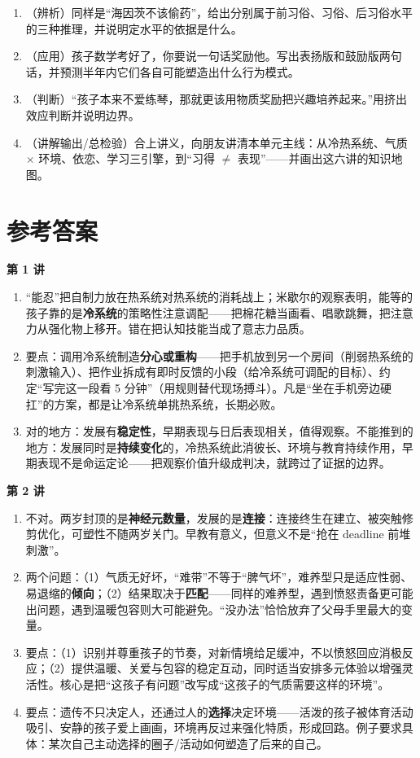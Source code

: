 \documentclass[UTF8,a4paper,11pt]{ctexart}
\begin{document}
\begin{exercise}[今日自测]
\begin{enumerate}
  \item （辨析）同样是“海因茨不该偷药”，给出分别属于前习俗、习俗、后习俗水平的三种推理，并说明定水平的依据是什么。
  \item （应用）孩子数学考好了，你要说一句话奖励他。写出表扬版和鼓励版两句话，并预测半年内它们各自可能塑造出什么行为模式。
  \item （判断）“孩子本来不爱练琴，那就更该用物质奖励把兴趣培养起来。”用挤出效应判断并说明边界。
  \item （讲解输出/总检验）合上讲义，向朋友讲清本单元主线：从冷热系统、气质 $\times$ 环境、依恋、学习三引擎，到“习得 $\neq$ 表现”——并画出这六讲的知识地图。
\end{enumerate}
\end{exercise}

\newpage

\section*{参考答案}

\textbf{第 1 讲}
\begin{enumerate}
  \item “能忍”把自制力放在热系统对热系统的消耗战上；米歇尔的观察表明，能等的孩子靠的是\textbf{冷系统}的策略性注意调配——把棉花糖当画看、唱歌跳舞，把注意力从强化物上移开。错在把认知技能当成了意志力品质。
  \item 要点：调用冷系统制造\textbf{分心或重构}——把手机放到另一个房间（削弱热系统的刺激输入）、把作业拆成有即时反馈的小段（给冷系统可调配的目标）、约定“写完这一段看 5 分钟”（用规则替代现场搏斗）。凡是“坐在手机旁边硬扛”的方案，都是让冷系统单挑热系统，长期必败。
  \item 对的地方：发展有\textbf{稳定性}，早期表现与日后表现相关，值得观察。不能推到的地方：发展同时是\textbf{持续变化}的，冷热系统此消彼长、环境与教育持续作用，早期表现不是命运定论——把观察价值升级成判决，就跨过了证据的边界。
\end{enumerate}

\textbf{第 2 讲}
\begin{enumerate}
  \item 不对。两岁封顶的是\textbf{神经元数量}，发展的是\textbf{连接}：连接终生在建立、被突触修剪优化，可塑性不随两岁关门。早教有意义，但意义不是“抢在 deadline 前堆刺激”。
  \item 两个问题：（1）气质无好坏，“难带”不等于“脾气坏”，难养型只是适应性弱、易退缩的\textbf{倾向}；（2）结果取决于\textbf{匹配}——同样的难养型，遇到愤怒责备更可能出问题，遇到温暖包容则大可能避免。“没办法”恰恰放弃了父母手里最大的变量。
  \item 要点：（1）识别并尊重孩子的节奏，对新情境给足缓冲，不以愤怒回应消极反应；（2）提供温暖、关爱与包容的稳定互动，同时适当安排多元体验以增强灵活性。核心是把“这孩子有问题”改写成“这孩子的气质需要这样的环境”。
  \item 要点：遗传不只决定人，还通过人的\textbf{选择}决定环境——活泼的孩子被体育活动吸引、安静的孩子爱上画画，环境再反过来强化特质，形成回路。例子要求具体：某次自己主动选择的圈子/活动如何塑造了后来的自己。
\end{enumerate}
\end{document}
